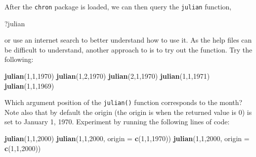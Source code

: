 \documentclass[]{book}
\newenvironment{Shaded}{\begin{snugshade}}{\end{snugshade}}
\newcommand{\KeywordTok}[1]{\textcolor[rgb]{0.13,0.29,0.53}{\textbf{{#1}}}}
\newcommand{\DataTypeTok}[1]{\textcolor[rgb]{0.13,0.29,0.53}{{#1}}}
\newcommand{\DecValTok}[1]{\textcolor[rgb]{0.00,0.00,0.81}{{#1}}}
\newcommand{\NormalTok}[1]{{#1}}
\begin{document}
After the \texttt{chron} package is loaded, we can then query the
\texttt{julian} function,

\begin{Shaded}
\begin{Highlighting}[]
\NormalTok{?julian}
\end{Highlighting}
\end{Shaded}

or use an internet search to better understand how to use it. As the
help files can be difficult to understand, another approach to is to try
out the function. Try the following:

\begin{Shaded}
\begin{Highlighting}[]
\KeywordTok{julian}\NormalTok{(}\DecValTok{1}\NormalTok{,}\DecValTok{1}\NormalTok{,}\DecValTok{1970}\NormalTok{)}
\KeywordTok{julian}\NormalTok{(}\DecValTok{1}\NormalTok{,}\DecValTok{2}\NormalTok{,}\DecValTok{1970}\NormalTok{)}
\KeywordTok{julian}\NormalTok{(}\DecValTok{2}\NormalTok{,}\DecValTok{1}\NormalTok{,}\DecValTok{1970}\NormalTok{)}
\KeywordTok{julian}\NormalTok{(}\DecValTok{1}\NormalTok{,}\DecValTok{1}\NormalTok{,}\DecValTok{1971}\NormalTok{)}
\KeywordTok{julian}\NormalTok{(}\DecValTok{1}\NormalTok{,}\DecValTok{1}\NormalTok{,}\DecValTok{1969}\NormalTok{)}
\end{Highlighting}
\end{Shaded}

Which argument position of the \texttt{julian()} function corresponds to
the month? Note also that by default the origin (the origin is when the
returned value is 0) is set to January 1, 1970. Experiment by running
the following lines of code:

\begin{Shaded}
\begin{Highlighting}[]
\KeywordTok{julian}\NormalTok{(}\DecValTok{1}\NormalTok{,}\DecValTok{1}\NormalTok{,}\DecValTok{2000}\NormalTok{)}
\KeywordTok{julian}\NormalTok{(}\DecValTok{1}\NormalTok{,}\DecValTok{1}\NormalTok{,}\DecValTok{2000}\NormalTok{, }\DataTypeTok{origin =} \KeywordTok{c}\NormalTok{(}\DecValTok{1}\NormalTok{,}\DecValTok{1}\NormalTok{,}\DecValTok{1970}\NormalTok{))}
\KeywordTok{julian}\NormalTok{(}\DecValTok{1}\NormalTok{,}\DecValTok{1}\NormalTok{,}\DecValTok{2000}\NormalTok{, }\DataTypeTok{origin =} \KeywordTok{c}\NormalTok{(}\DecValTok{1}\NormalTok{,}\DecValTok{1}\NormalTok{,}\DecValTok{2000}\NormalTok{))}
\end{Highlighting}
\end{Shaded}
\end{document}
